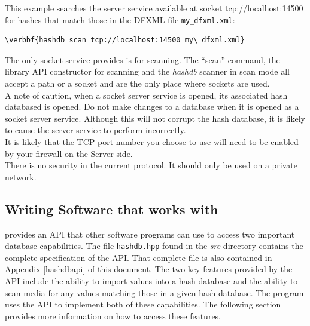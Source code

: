 \documentclass[11pt,fleqn]{article} %
\begin{document}
This example searches
the \hash server service available at socket tcp://localhost:14500 for hashes that match those in the DFXML file \texttt{my\_dfxml.xml}:
\begin{Verbatim}[commandchars=\\\{\}]
\verbbf{hashdb scan tcp://localhost:14500 my\_dfxml.xml}
\end{Verbatim} 

The only socket service \hash provides is for scanning. The \hash ``scan'' command, the \hash library API constructor for scanning and the \bulk \textit{hashdb} scanner in scan mode all accept a path or a socket and are the only place where sockets are used.\\

A note of caution, when a socket server service is opened, its associated hash databased is opened. Do not make changes to a database when it is opened as a socket server service. Although this will not corrupt the hash database, it is likely to cause the server service to perform incorrectly.\\

It is likely that the TCP port number you choose to use will need to be enabled by your firewall on the Server side.\\

There is no security in the current protocol. It should only be used on a private network.

\subsection{Writing Software that works with \hash}
\label{APISection}
\hash provides an API that other software programs can use to access two important database capabilities. The file \texttt{hashdb.hpp} found in the \textit{src} directory contains the complete specification of the API. That complete file is also contained in Appendix \ref{hashdbapi} of this document.  The two key features provided by the API include the ability to import values into a hash database and the ability to scan media for any values matching those in a given hash database.  The \bulk program uses the \hash API to implement both of these capabilities.  The following section provides more information on how to access these features. \\
\end{document}
